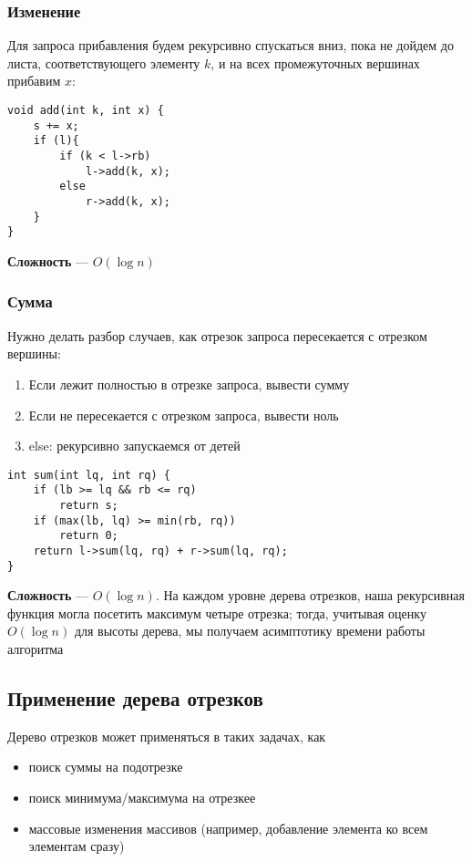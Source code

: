 \documentclass[a4paper]{article}
\begin{document}
\subsubsection{Изменение}
Для запроса прибавления будем рекурсивно спускаться вниз, пока не дойдем до листа, соответствующего элементу $k$, и на всех промежуточных вершинах прибавим $x$:
\begin{lstlisting}
void add(int k, int x) {
    s += x;
    if (l){
        if (k < l->rb)
            l->add(k, x);
        else
            r->add(k, x);
    }
}
\end{lstlisting}
\indent \textbf{Сложность} — $O(\log n)$

\subsubsection{Сумма}
Нужно делать разбор случаев, как отрезок запроса пересекается с отрезком вершины:
\begin{enumerate}
    \item Если лежит полностью в отрезке запроса, вывести сумму
    \item Если не пересекается с отрезком запроса, вывести ноль
    \item else: рекурсивно запускаемся от детей
\end{enumerate}
\begin{lstlisting}
int sum(int lq, int rq) {
    if (lb >= lq && rb <= rq)
        return s;
    if (max(lb, lq) >= min(rb, rq))
        return 0;
    return l->sum(lq, rq) + r->sum(lq, rq);
}
\end{lstlisting}
\indent \textbf{Сложность} — $O(\log n)$. На каждом уровне дерева отрезков, наша рекурсивная функция могла посетить максимум четыре отрезка; тогда, учитывая оценку $O (\log n)$ для высоты дерева, мы получаем асимптотику времени работы алгоритма


\subsection{Применение дерева отрезков}
Дерево отрезков может применяться в таких задачах, как
\begin{itemize}
    \item поиск суммы на подотрезке
    \item поиск минимума/максимума на отрезкее
    \item массовые изменения массивов (например, добавление элемента ко всем элементам сразу)
\end{itemize}
\end{document}

